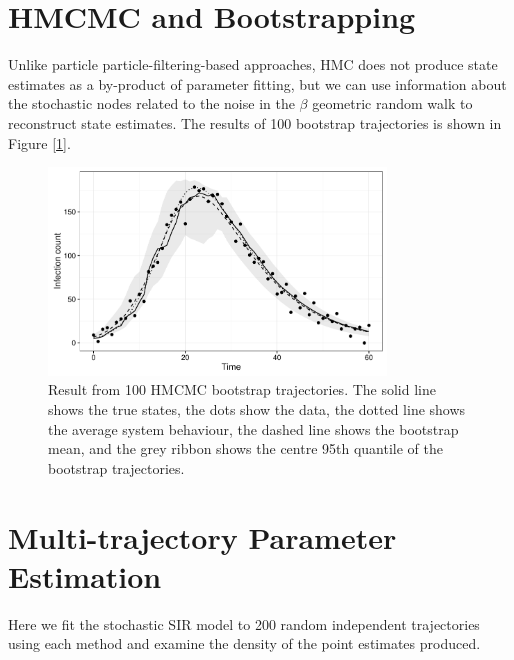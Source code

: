 \section{HMCMC and Bootstrapping}

	Unlike particle particle-filtering-based approaches, HMC does not produce state estimates as a by-product of parameter fitting, but we can use information about the stochastic nodes related to the noise in the $\beta$ geometric random walk to reconstruct state estimates. The results of 100 bootstrap trajectories is shown in Figure [\ref{hmcboot}].

	\begin{figure}
        \centering
        \captionsetup{width=.8\linewidth}
        \includegraphics[width=0.8\textwidth]{./images/hmcboot.pdf}
        \caption{Result from 100 HMCMC bootstrap trajectories. The solid line shows the true states, the dots show the data, the dotted line shows the average system behaviour, the dashed line shows the bootstrap mean, and the grey ribbon shows the centre 95th quantile of the bootstrap trajectories. \label{hmcboot}}
    \end{figure}


\section{Multi-trajectory Parameter Estimation}

	Here we fit the stochastic SIR model to 200 random independent trajectories using each method and examine the density of the point estimates produced. 

